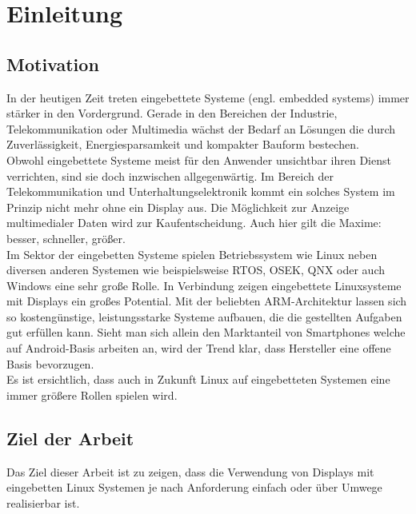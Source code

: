 
\chapter{Einleitung}
\label{cha:Einleitung}

\section{Motivation}
In der heutigen Zeit treten eingebettete Systeme (engl. embedded systems) immer stärker in den Vordergrund. Gerade in den Bereichen der Industrie, Telekommunikation oder Multimedia wächst der Bedarf an Lösungen die durch Zuverlässigkeit, Energiesparsamkeit und kompakter Bauform bestechen.\\
Obwohl eingebettete Systeme meist für den Anwender unsichtbar ihren Dienst verrichten, sind sie doch inzwischen allgegenwärtig. Im Bereich der Telekommunikation und Unterhaltungselektronik kommt ein solches System im Prinzip nicht mehr ohne ein Display aus. Die Möglichkeit zur Anzeige multimedialer Daten wird zur Kaufentscheidung. Auch hier gilt die Maxime: besser, schneller, größer.\\
Im Sektor der eingebetten Systeme spielen Betriebssystem wie Linux neben diversen anderen Systemen wie beispielsweise RTOS, OSEK, QNX oder auch Windows eine sehr große Rolle. In Verbindung zeigen eingebettete Linuxsysteme mit Displays ein großes Potential. Mit der beliebten ARM-Architektur lassen sich so kostengünstige, leistungsstarke Systeme aufbauen, die die gestellten Aufgaben gut erfüllen kann. Sieht man sich allein den Marktanteil von Smartphones welche auf Android-Basis arbeiten an, wird der Trend klar, dass Hersteller eine offene Basis bevorzugen. \cite{Brandt2013}\\
Es ist ersichtlich, dass auch in Zukunft Linux auf eingebetteten Systemen eine immer größere Rollen spielen wird. 

\section{Ziel der Arbeit}
Das Ziel dieser Arbeit ist zu zeigen, dass die Verwendung von Displays mit eingebetten Linux Systemen je nach Anforderung einfach oder über Umwege realisierbar ist.\\ 


